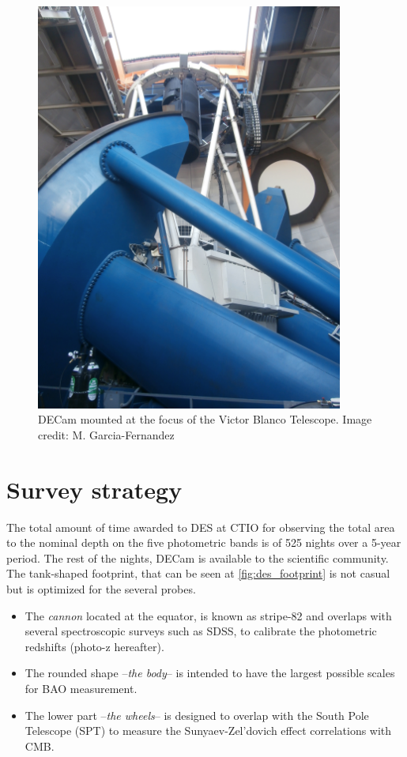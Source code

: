 \begin{figure}
\begin{center}
\includegraphics[width=0.9\textwidth]{./Pictures/telescope_DES_mine.jpg}
\caption{DECam mounted at the focus of the Victor Blanco Telescope. Image credit: M. Garcia-Fernandez}
\label{fig:decam}
\end{center}
\end{figure}

\section{Survey strategy}
The total amount of time awarded to DES at CTIO for observing the total area to the nominal depth on the five photometric bands is of 525 nights over a 5-year period. The rest of the nights, DECam is available to the scientific community. The tank-shaped footprint, that can be seen at \autoref{fig:des_footprint} is not casual but is optimized for the several probes.
\begin{itemize}
	\item The {\it cannon} located at the equator, is known as stripe-82 and overlaps with several spectroscopic surveys such as SDSS, to calibrate the photometric redshifts (photo-z hereafter).
    \item The rounded shape --{\it the body}-- is intended to have the largest possible scales for BAO measurement.
    \item The lower part --{\it the wheels}-- is designed to overlap with the South Pole Telescope (SPT) to measure the Sunyaev-Zel'dovich effect correlations with CMB.
\end{itemize}

